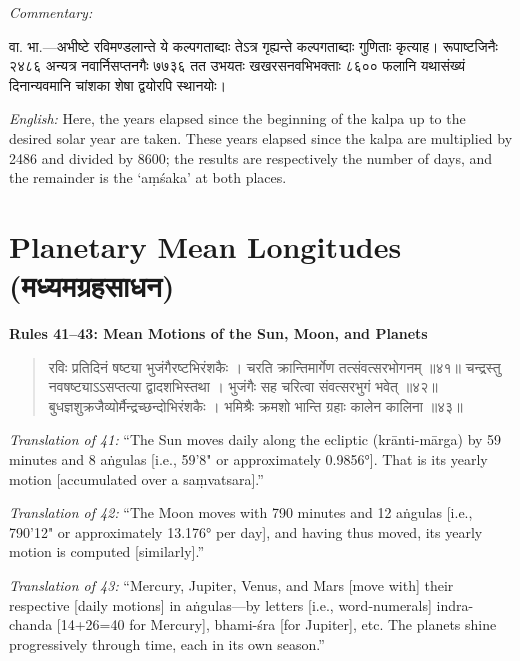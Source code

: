 \documentclass[11pt,a4paper]{book}
\newcommand{\dev}[1]{{\devanagarifont #1}}
\newenvironment{shloka}{%
  \begin{verse}
  \devanagarifont\color{versecolor}%
}{\end{verse}}
\newenvironment{vasaanaskt}{%
  \par\vspace{0.5em}\noindent\small\textit{Commentary:}%
}{\par\vspace{0.5em}}
\newcommand{\ruleheading}[1]{%
  \par\vspace{0.8em}\noindent\textbf{\color{sectioncolor}#1}\par\vspace{0.3em}%
}
\begin{document}
\begin{vasaanaskt}
\dev{वा. भा.}---अभीष्टे रविमण्डलान्ते ये कल्पगताब्दाः तेऽत्र गृह्यन्ते कल्पगताब्दाः गुणिताः कृत्याह। रूपाष्टजिनैः २४८६ अन्यत्र नवार्निसप्तनगैः ७७३६ तत उभयतः खखरसनवभिभक्ताः ८६०० फलानि यथासंख्यं दिनान्यवमानि चांशका शेषा द्वयोरपि स्थानयोः।

\textit{English:} Here, the years elapsed since the beginning of the kalpa up to the desired solar year are taken. These years elapsed since the kalpa are multiplied by 2486 and divided by 8600; the results are respectively the number of days, and the remainder is the `aṃśaka' at both places.
\end{vasaanaskt}

\section{Planetary Mean Longitudes (\dev{मध्यमग्रहसाधन})}

\ruleheading{Rules 41--43: Mean Motions of the Sun, Moon, and Planets}

\begin{shloka}
\begin{altverse}
\dev{रविः प्रतिदिनं षष्ट्या भुजंगैरष्टभिरंशकैः ।}
\dev{चरति क्रान्तिमार्गेण तत्संवत्सरभोगनम् ॥४१॥}
\dev{चन्द्रस्तु नवषष्ट्याऽऽसप्तत्या द्वादशभिस्तथा ।}
\dev{भुजंगैः सह चरित्वा संवत्सरभुगं भवेत् ॥४२॥}
\dev{बुधज्ञशुक्रजैव्योर्मैन्द्रच्छन्दोभिरंशकैः ।}
\dev{भमिश्रैः क्रमशो भान्ति ग्रहाः कालेन कालिना ॥४३॥}
\end{altverse}
\end{shloka}

\textit{Translation of 41:} ``The Sun moves daily along the ecliptic (krānti-mārga) by 59 minutes and 8 aṅgulas [i.e., 59'8" or approximately 0.9856°]. That is its yearly motion [accumulated over a saṃvatsara].''

\textit{Translation of 42:} ``The Moon moves with 790 minutes and 12 aṅgulas [i.e., 790'12" or approximately 13.176° per day], and having thus moved, its yearly motion is computed [similarly].''

\textit{Translation of 43:} ``Mercury, Jupiter, Venus, and Mars [move with] their respective [daily motions] in aṅgulas---by letters [i.e., word-numerals] indra-chanda [14+26=40 for Mercury], bhami-śra [for Jupiter], etc. The planets shine progressively through time, each in its own season.''
\end{document}
